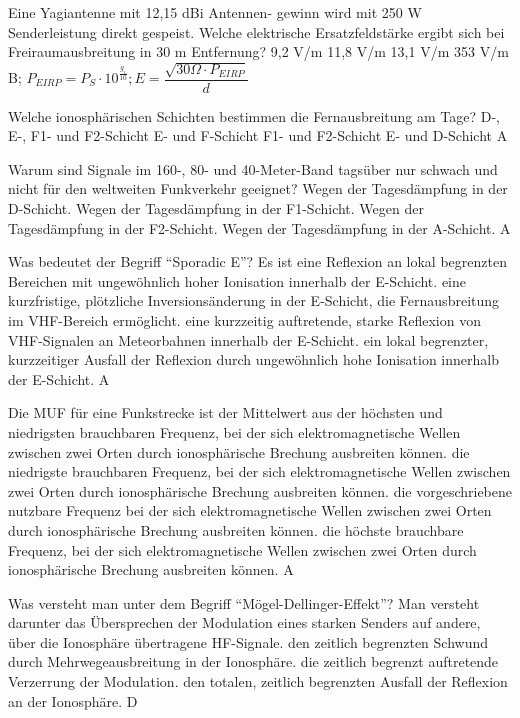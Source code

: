{Eine Yagiantenne mit 12,15 dBi Antennen- gewinn wird mit 250 W Senderleistung direkt gespeist. Welche elektrische Ersatzfeldstärke ergibt sich bei Freiraumausbreitung in 30 m Entfernung?}%
{9,2 V/m}%
{11,8 V/m}%
{13,1 V/m}%
{353 V/m}%
{B; $P_{EIRP} = P_S \cdot 10^{\frac{g_i}{10}}; E=\dfrac{\sqrt{30\Omega \cdot P_{EIRP}}}{d}$}%

{Welche ionosphärischen Schichten bestimmen die Fernausbreitung am Tage?}%
{D-, E-, F1- und F2-Schicht}%
{E- und F-Schicht}%
{F1- und F2-Schicht}%
{E- und D-Schicht}%
{A}%

{ Warum sind Signale im 160-, 80- und 40-Meter-Band tagsüber nur schwach und nicht für den weltweiten Funkverkehr geeignet?}%
{Wegen der Tagesdämpfung in der D-Schicht.}%
{Wegen der Tagesdämpfung in der F1-Schicht.}%
{Wegen der Tagesdämpfung in der F2-Schicht.}%
{Wegen der Tagesdämpfung in der A-Schicht.}%
{A}%

{Was bedeutet der Begriff ``Sporadic E''? Es ist}%
{eine Reflexion an lokal begrenzten Bereichen mit ungewöhnlich hoher Ionisation innerhalb der E-Schicht.}%
{eine kurzfristige, plötzliche Inversionsänderung in der E-Schicht, die Fernausbreitung im VHF-Bereich ermöglicht.}%
{eine kurzzeitig auftretende, starke Reflexion von VHF-Signalen an Meteorbahnen innerhalb der E-Schicht.}%
{ein lokal begrenzter, kurzzeitiger Ausfall der Reflexion durch ungewöhnlich hohe Ionisation innerhalb der E-Schicht.}%
{A}%

{Die MUF für eine Funkstrecke ist}%
{der Mittelwert aus der höchsten und niedrigsten brauchbaren Frequenz, bei der sich elektromagnetische Wellen zwischen zwei Orten durch ionosphärische Brechung ausbreiten können.}%
{die niedrigste brauchbaren Frequenz, bei der sich elektromagnetische Wellen zwischen zwei Orten durch ionosphärische Brechung ausbreiten können.}%
{die vorgeschriebene nutzbare Frequenz bei der sich elektromagnetische Wellen zwischen zwei Orten durch ionosphärische Brechung ausbreiten können.}%
{die höchste brauchbare Frequenz, bei der sich elektromagnetische Wellen zwischen zwei Orten durch ionosphärische Brechung ausbreiten können.}%
{A}%

{Was versteht man unter dem Begriff ``Mögel-Dellinger-Effekt''? Man versteht darunter}%
{das Übersprechen der Modulation eines starken Senders auf andere, über die Ionosphäre übertragene HF-Signale.}%
{den zeitlich begrenzten Schwund durch Mehrwegeausbreitung in der Ionosphäre.}%
{die zeitlich begrenzt auftretende Verzerrung der Modulation.}%
{den totalen, zeitlich begrenzten Ausfall der Reflexion an der Ionosphäre.}%
{D}%
